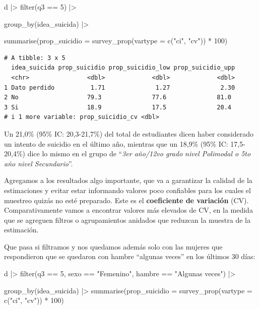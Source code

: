 \documentclass[
  spanish,
  a4paper,
]{scrbook}
\newenvironment{Shaded}{\begin{snugshade}}{\end{snugshade}}
\newcommand{\AttributeTok}[1]{\textcolor[rgb]{0.40,0.45,0.13}{#1}}
\newcommand{\DecValTok}[1]{\textcolor[rgb]{0.68,0.00,0.00}{#1}}
\newcommand{\FunctionTok}[1]{\textcolor[rgb]{0.28,0.35,0.67}{#1}}
\newcommand{\NormalTok}[1]{\textcolor[rgb]{0.00,0.23,0.31}{#1}}
\newcommand{\SpecialCharTok}[1]{\textcolor[rgb]{0.37,0.37,0.37}{#1}}
\newcommand{\StringTok}[1]{\textcolor[rgb]{0.13,0.47,0.30}{#1}}
\begin{document}
\begin{Shaded}
\begin{Highlighting}[]
\NormalTok{d }\SpecialCharTok{|\textgreater{}}
  \FunctionTok{filter}\NormalTok{(q3 }\SpecialCharTok{==} \DecValTok{5}\NormalTok{) }\SpecialCharTok{|\textgreater{}}

  \FunctionTok{group\_by}\NormalTok{(idea\_suicida) }\SpecialCharTok{|\textgreater{}}

  \FunctionTok{summarise}\NormalTok{(}\AttributeTok{prop\_suicidio =} \FunctionTok{survey\_prop}\NormalTok{(}\AttributeTok{vartype =} \FunctionTok{c}\NormalTok{(}\StringTok{"ci"}\NormalTok{, }\StringTok{"cv"}\NormalTok{)) }\SpecialCharTok{*} \DecValTok{100}\NormalTok{)}
\end{Highlighting}
\end{Shaded}

\begin{verbatim}
# A tibble: 3 x 5
  idea_suicida prop_suicidio prop_suicidio_low prop_suicidio_upp
  <chr>                <dbl>             <dbl>             <dbl>
1 Dato perdido          1.71              1.27              2.30
2 No                   79.3              77.6              81.0 
3 Si                   18.9              17.5              20.4 
# i 1 more variable: prop_suicidio_cv <dbl>
\end{verbatim}

Un 21,0\% (95\% IC: 20,3-21,7\%) del total de estudiantes dicen haber
considerado un intento de suicidio en el último año, mientras que un
18,9\% (95\% IC: 17,5-20,4\%) dice lo mismo en el grupo de ``\emph{3er
año/12vo grado nivel Polimodal o 5to año nivel Secundario}''.

Agregamos a los resultados algo importante, que va a garantizar la
calidad de la estimaciones y evitar estar informando valores poco
confiables para los cuales el muestreo quizás no esté preparado. Este es
el \textbf{coeficiente de variación} (CV). Comparativamente vamos a
encontrar valores más elevados de CV, en la medida que se agreguen
filtros o agrupamientos anidados que reduzcan la muestra de la
estimación.

Que pasa si filtramos y nos quedamos además solo con las mujeres que
respondieron que se quedaron con hambre ``algunas veces'' en los últimos
30 días:

\begin{Shaded}
\begin{Highlighting}[]
\NormalTok{d }\SpecialCharTok{|\textgreater{}}
  \FunctionTok{filter}\NormalTok{(q3 }\SpecialCharTok{==} \DecValTok{5}\NormalTok{, sexo }\SpecialCharTok{==} \StringTok{"Femenino"}\NormalTok{, hambre }\SpecialCharTok{==} \StringTok{"Algunas veces"}\NormalTok{) }\SpecialCharTok{|\textgreater{}}

  \FunctionTok{group\_by}\NormalTok{(idea\_suicida) }\SpecialCharTok{|\textgreater{}}
  \FunctionTok{summarise}\NormalTok{(}\AttributeTok{prop\_suicidio =} \FunctionTok{survey\_prop}\NormalTok{(}\AttributeTok{vartype =} \FunctionTok{c}\NormalTok{(}\StringTok{"ci"}\NormalTok{, }\StringTok{"cv"}\NormalTok{)) }\SpecialCharTok{*} \DecValTok{100}\NormalTok{)}
\end{Highlighting}
\end{Shaded}
\end{document}
